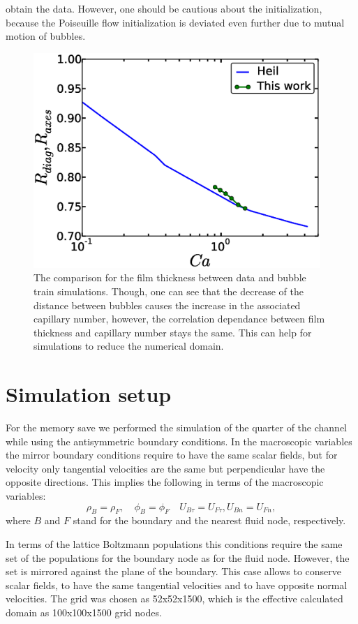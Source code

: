 \documentclass{article}
\begin{document}
obtain the data. However, one should be cautious about the initialization, because the Poiseuille
flow initialization is deviated even further due to mutual motion of bubbles.
\begin{figure}
\includegraphics[width=0.97\textwidth]{Figures/capillaries_comparison_train.eps}
\caption{The comparison for the film thickness between \citet{heil-threedim} data and bubble train
simulations. Though, one can see that the decrease of the distance between bubbles causes the
increase in the associated capillary number, however, the correlation dependance between film
thickness and capillary number stays the same. This can help for simulations to reduce the
numerical domain. \label{fig:capillaries:train}}
\end{figure}


\section{Simulation setup}

\label{append:sym}
For the memory save we performed the simulation of the quarter of the channel while using the
antisymmetric boundary conditions. In the macroscopic variables the mirror boundary conditions
require to have the same scalar fields, but for velocity only tangential velocities are the same
but perpendicular have the opposite directions. This implies the following in terms of the
macroscopic variables:
\begin{equation}
\rho_B = \rho_F, \quad \phi_B = \phi_F \quad U_{B\tau}=U_{F\tau}, U_{B n}=U_{F n}, 
\end{equation}
 where $B$ and $F$ stand for the boundary and the nearest fluid node, respectively. 

In terms of the lattice Boltzmann populations this conditions require the same set of the
populations for the boundary node as for the fluid node. However, the set is mirrored against the
plane of the boundary. This case allows to conserve scalar fields, to have the same tangential
velocities and to have opposite normal velocities. The grid was chosen as 52x52x1500, which is the
effective calculated domain as 100x100x1500 grid nodes. 



\end{document}
